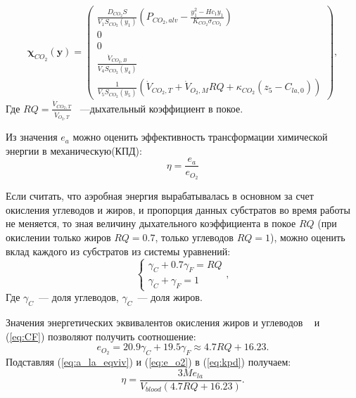 \begin{equation} \label{co2sourceLa}
\mathbf{\chi}_{CO_{2}}(\mathbf{y})=\begin{pmatrix}
\displaystyle \frac{D_{CO_{2}}S}{V_{1}S_{CO_{2}}(y_{1})}\left(P_{CO_{2},alv}-\frac{y_{1}^2-Hc_{1}y_{1}}{K_{CO_{2}} \sigma_{CO_{2}}} \right) \\
0 \\
0 \\
\displaystyle \frac{\dot{V}_{CO_{2},B}}{V_{4}S_{CO_{2}}(y_{4})} \\
\displaystyle \frac{1}{V_{5}S_{CO_{2}}(y_{5})}\left(\dot{V}_{CO_{2},T}+\dot{V}_{O_{2},M}RQ+\kappa_{CO_{2}}\left(z_{5}-C_{la,0}\right) \right)
\end{pmatrix},
\end{equation}
Где $\displaystyle RQ=\frac{\dot{V}_{CO_{2},T}}{\dot{V}_{O_{2},T}}$  ~---дыхательный коэффициент в покое.

Из значения \(e_{a}\) можно оценить эффективность трансформации химической энергии в механическую(КПД):
\begin{equation}\label{eq:kpd}
\eta =\frac{e_{a}}{e_{O_{2}}}
\end{equation}

Если считать, что аэробная энергия вырабатывалась в основном за счет окисления углеводов и жиров, и пропорция данных субстратов во время работы не меняется, то зная величину дыхательного коэффициента в покое \(RQ\) (при окислении только жиров \(RQ=0.7\), только углеводов \(RQ=1\)), можно оценить вклад каждого из субстратов из системы уравнений:
\begin{equation}  \label{eq:CF}
\begin{cases}
\gamma_{C}+0.7\gamma_{F} = RQ  \\
\gamma_{C}+\gamma_{F} = 1
\end{cases},
\end{equation}
Где \(\gamma_{C}\)~--- доля углеводов, \(\gamma_{C}\)~--- доля жиров.

Значения энергетических эквивалентов окисления жиров и углеводов ~\cite{maughan1997} и (\ref{eq:CF}) позволяют получить соотношение:
\begin{equation} \label{eq:e_o2}
e_{O_{2}}=20.9\gamma_{C}+19.5\gamma_{F} \approx 4.7 RQ + 16.23.
\end{equation}
Подставляя (\ref{eq:a_la_eqviv}) и (\ref{eq:e_o2}) в (\ref{eq:kpd}) получаем:
\begin{equation}
\eta =\frac{3M e_{la}}{V_{blood}\left(4.7 RQ + 16.23\right)}.
\end{equation}

